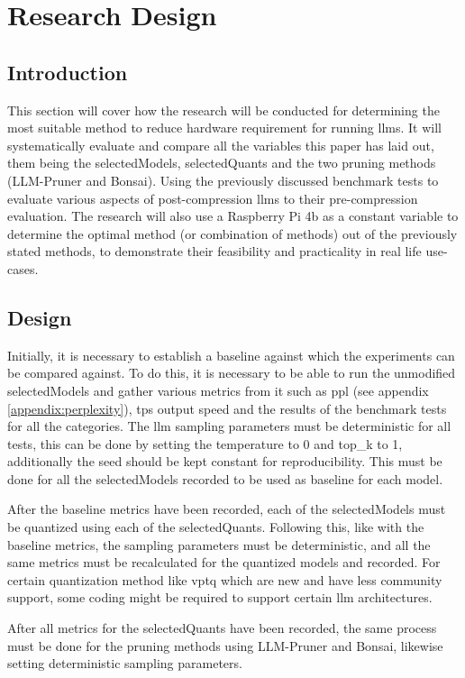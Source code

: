 \documentclass{ifacconf}
\begin{document}
	
	\section{Research Design}
	\subsection{Introduction}
	This section will cover how the research will be conducted for determining the most suitable method to reduce hardware requirement for running \glspl{llm}. It will systematically evaluate and compare all the variables this paper has laid out, them being the \gls{selectedModels}, \gls{selectedQuants} and the two pruning methods (LLM-Pruner and Bonsai). Using the previously discussed benchmark tests to evaluate various aspects of post-compression \glspl{llm} to their pre-compression evaluation. The research will also use a Raspberry Pi 4b as a constant variable to determine the optimal method (or combination of methods) out of the previously stated methods, to demonstrate their feasibility and practicality in real life use-cases.
	
	\subsection{Design}
	Initially, it is necessary to establish a baseline against which the experiments can be compared against. To do this, it is necessary to be able to run the unmodified \gls{selectedModels} and gather various metrics from it such as \gls{ppl} (see appendix \ref{appendix:perplexity}), \gls{tps} output speed and the results of the benchmark tests for all the categories. The \gls{llm} sampling parameters must be deterministic for all tests, this can be done by setting the temperature to 0 and top\_k to 1, additionally the seed should be kept constant for reproducibility. This must be done for all the \gls{selectedModels} recorded to be used as baseline for each model.
	
	After the baseline metrics have been recorded, each of the \gls{selectedModels} must be quantized using each of the \gls{selectedQuants}. Following this, like with the baseline metrics, the sampling parameters must be deterministic, and all the same metrics must be recalculated for the quantized models and recorded. For certain quantization method like \gls{vptq} which are new and have less community support, some coding might be required to support certain \gls{llm} architectures.
	
	After all metrics for the \gls{selectedQuants} have been recorded, the same process must be done for the pruning methods using LLM-Pruner and Bonsai, likewise setting deterministic sampling parameters.
	
\end{document}
